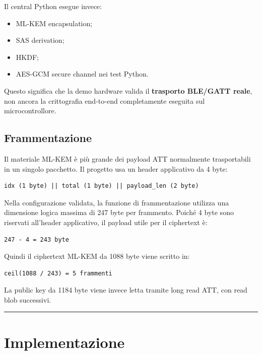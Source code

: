 \documentclass[11pt,a4paper]{article}
\providecommand{\tightlist}{\setlength{\itemsep}{0pt}\setlength{\parskip}{0pt}}
\begin{document}
Il central Python esegue invece:

\begin{itemize}
\tightlist
\item
  ML-KEM encapsulation;
\item
  SAS derivation;
\item
  HKDF;
\item
  AES-GCM secure channel nei test Python.
\end{itemize}

Questo significa che la demo hardware valida il \textbf{trasporto
BLE/GATT reale}, non ancora la crittografia end-to-end completamente
eseguita sul microcontrollore.

\subsection{Frammentazione}\label{frammentazione}

Il materiale ML-KEM è più grande dei payload ATT normalmente
trasportabili in un singolo pacchetto. Il progetto usa un header
applicativo da 4 byte:

\begin{lstlisting}
idx (1 byte) || total (1 byte) || payload_len (2 byte)
\end{lstlisting}

Nella configurazione validata, la funzione di frammentazione utilizza
una dimensione logica massima di 247 byte per frammento. Poiché 4 byte
sono riservati all'header applicativo, il payload utile per il
ciphertext è:

\begin{lstlisting}
247 - 4 = 243 byte
\end{lstlisting}

Quindi il ciphertext ML-KEM da 1088 byte viene scritto in:

\begin{lstlisting}
ceil(1088 / 243) = 5 frammenti
\end{lstlisting}

La public key da 1184 byte viene invece letta tramite long read ATT, con
read blob successivi.

\begin{center}\rule{0.5\linewidth}{0.5pt}\end{center}

\section{Implementazione}\label{capitolo-5---implementazione}
\end{document}
